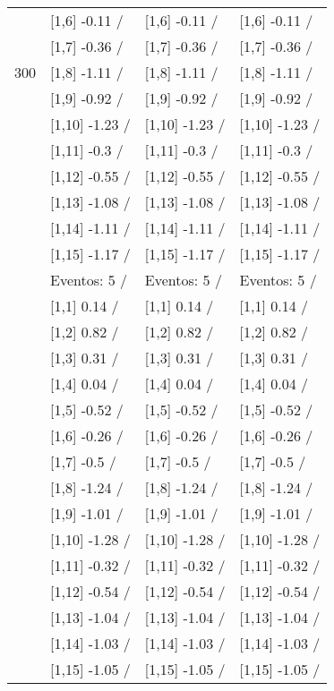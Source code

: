 \begin{table}
\begin{tabular}[t]{llll}
 & {}[1,6] -0.11  / & {}[1,6] -0.11  / & {}[1,6] -0.11  /\\
 & {}[1,7] -0.36  / & {}[1,7] -0.36  / & {}[1,7] -0.36  /\\
300 & {}[1,8] -1.11  / & {}[1,8] -1.11  / & {}[1,8] -1.11  /\\
\addlinespace
 & {}[1,9] -0.92  / & {}[1,9] -0.92  / & {}[1,9] -0.92  /\\
 & {}[1,10] -1.23  / & {}[1,10] -1.23  / & {}[1,10] -1.23  /\\
 & {}[1,11] -0.3  / & {}[1,11] -0.3  / & {}[1,11] -0.3  /\\
 & {}[1,12] -0.55  / & {}[1,12] -0.55  / & {}[1,12] -0.55  /\\
 & {}[1,13] -1.08  / & {}[1,13] -1.08  / & {}[1,13] -1.08  /\\
\addlinespace
 & {}[1,14] -1.11  / & {}[1,14] -1.11  / & {}[1,14] -1.11  /\\
 & {}[1,15] -1.17  / & {}[1,15] -1.17  / & {}[1,15] -1.17  /\\
 & Eventos:  5 / & Eventos:  5 / & Eventos:  5 /\\
 & {}[1,1] 0.14  / & {}[1,1] 0.14  / & {}[1,1] 0.14  /\\
 & {}[1,2] 0.82  / & {}[1,2] 0.82  / & {}[1,2] 0.82  /\\
\addlinespace
 & {}[1,3] 0.31  / & {}[1,3] 0.31  / & {}[1,3] 0.31  /\\
 & {}[1,4] 0.04  / & {}[1,4] 0.04  / & {}[1,4] 0.04  /\\
 & {}[1,5] -0.52  / & {}[1,5] -0.52  / & {}[1,5] -0.52  /\\
 & {}[1,6] -0.26  / & {}[1,6] -0.26  / & {}[1,6] -0.26  /\\
 & {}[1,7] -0.5  / & {}[1,7] -0.5  / & {}[1,7] -0.5  /\\
\addlinespace
500 & {}[1,8] -1.24  / & {}[1,8] -1.24  / & {}[1,8] -1.24  /\\
 & {}[1,9] -1.01  / & {}[1,9] -1.01  / & {}[1,9] -1.01  /\\
 & {}[1,10] -1.28  / & {}[1,10] -1.28  / & {}[1,10] -1.28  /\\
 & {}[1,11] -0.32  / & {}[1,11] -0.32  / & {}[1,11] -0.32  /\\
 & {}[1,12] -0.54  / & {}[1,12] -0.54  / & {}[1,12] -0.54  /\\
\addlinespace
 & {}[1,13] -1.04  / & {}[1,13] -1.04  / & {}[1,13] -1.04  /\\
 & {}[1,14] -1.03  / & {}[1,14] -1.03  / & {}[1,14] -1.03  /\\
 & {}[1,15] -1.05  / & {}[1,15] -1.05  / & {}[1,15] -1.05  /\\
\bottomrule
\end{tabular}
\end{table}
